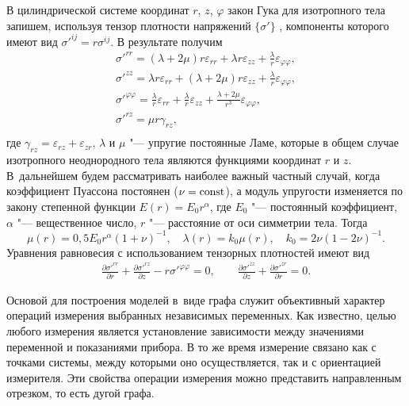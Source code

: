 В
цилиндрической системе координат $r$, $z$, $\varphi$   закон Гука для
изотропного тела запишем, используя тензор плотности напряжений
$\{\sigma'\}$ , компоненты которого имеют вид
$\sigma'^{ij}=r\sigma^{ij}$. В результате получим
\begin{equation}\label{tyrymov:sis1}
\begin{array}{l}
  \displaystyle \sigma'^{rr}=(\lambda+2\mu)r\varepsilon_{rr}+\lambda r\varepsilon_{zz}+
  \frac{\lambda}{r}\varepsilon_{\varphi\varphi} , \\
    \displaystyle  \sigma'^{zz} =\lambda r\varepsilon_{rr}+    (\lambda+2\mu)r\varepsilon_{zz}+\frac{\lambda}{r}\varepsilon_{\varphi\varphi}, \\
  \displaystyle  \sigma'^{\varphi\varphi}=\frac{\lambda}{r}\varepsilon_{rr}+\frac{\lambda}{r}\varepsilon_{zz}+
  \frac{\lambda+2\mu}{r^3}\varepsilon_{\varphi\varphi} ,\\
    \sigma'^{rz}=\mu r \gamma_{rz}, \\
\end{array}
\end{equation}
где $\gamma_{rz}=\varepsilon_{rz}+\varepsilon_{zr}$, $ \lambda$ и $\mu$ "--- упругие постоянные Ламе, которые в общем случае изотропного неоднородного тела являются функциями координат $r$ и $z$. 
В~дальнейшем будем рассматривать наиболее важный частный случай, когда коэффициент Пуассона постоянен ($\nu ={\rm const} $), а модуль упругости изменяется по закону степенной функции $E(r)=E_0r^\alpha$, где $E_0$ "--- постоянный коэффициент, $ \alpha $ "--- вещественное число, $r$ "--- расстояние от оси симметрии тела.
Тогда
\begin{equation}\label{tyrymov:ur2}
   \mu(r)=0,5E_0r^\alpha(1+\nu)^{-1},\quad \lambda(r)=k_0\mu(r),\quad    k_0=2\nu(1-2\nu)^{-1}.
\end{equation}
Уравнения равновесия с использованием тензорных плотностей имеют вид \cite{tyr:bib:4}
\begin{equation}\label{tyrymov:sis2}
\begin{array}{l}
  \displaystyle \frac{\partial\sigma'^{rr} }{\partial r}+\frac{\partial\sigma'^{rz} }{\partial z}-
  r\sigma'^{\varphi\varphi}=0,\qquad
   \frac{\partial\sigma'^{zz} }{\partial z}+\frac{\partial\sigma'^{zr} }{\partial r}=0. 
\end{array}
    \end{equation}

\smallskip

 Основой для
построения моделей в~виде графа служит объективный характер
операций измерения выбранных независимых переменных. Как известно,
целью любого измерения является установление зависимости между
значениями переменной и показаниями прибора. В то же время
измерение связано как с точками системы, между которыми оно
осуществляется, так и с ориентацией измерителя. Эти свойства
операции измерения можно представить направленным отрезком, то
есть дугой графа.

